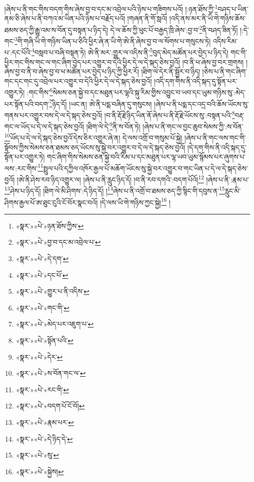 །ཞེས་པ་ནི་གང་གིས་བདག་གིས་ཞེས་བྱ་བ་དང་མ་འབྲེལ་པའི་ཉེས་པ་གཟིགས་པའོ། །:ཉན་ཐོས་ཀྱི་\footnote{«སྣར་»«པེ་»ཉན་ཐོས་ཀྱིས་}བཤད་པ་ཡིན་ནམ་ཅི་ཞེས་པ་ནི་བཀའ་མ་ཡིན་པའི་ཉེས་པ་བརྗོད་པའོ། །གཞན་ནི་གོ་སླའོ། །འདི་ནས་མར་ནི་ཡི་གེ་གཉིས་ཆོས་ཐམས་ཅད་ཀྱི་རྒྱུ་འམ་ས་བོན་དུ་བསྟན་པ་ཉིད་དེ། དེ་ལ་ཆོས་ཀྱི་ཕུང་པོ་བརྒྱད་ཁྲི་ཞེས་:བྱ་བ་\footnote{«སྣར་»«པེ་»བྱ་བ་དང་མ་འབྲེལ་པ་}ནི་བཤད་ཟིན་ཏོ། །:དེ་གང་\footnote{«སྣར་»«པེ་»དེ་དག་}གི་གཞི་ཡི་གེ་གཉིས་ཡིན་པ་ཅིའི་ཕྱིར་ཞེ་ན་ཡི་གེ་ཨེ་ནི་ཞེས་བྱ་བ་ལ་སོགས་པ་གསུངས་ཏེ། འདིས་རིམ་པ་:དང་པོའི་\footnote{«སྣར་»«པེ་»དང་པོ་}བསླབ་པ་བཞི་བསྟན་ཏེ། ཨེ་ནི་མར་:གྱུར་ལ་འདིས་ནི་\footnote{«སྣར་»«པེ་»གྱུར་པ་ནི་འདིས་}བུད་མེད་མཚོན་པར་བྱེད་པ་ཉིད་དེ། གང་གི་ཕྱིར་གང་གིས་གང་ལ་གང་ཞིག་བྱེད་པར་འགྱུར་བ་དེའི་ཕྱིར་དེ་ལ་དེ་སྐད་ཅེས་བྱའོ། །བ་ནི་ཕ་ཞེས་བྱ་བར་གྲགས། །ཞེས་བྱ་བ་ནི་བ་ཞེས་བྱ་བ་ཕ་མཚོན་པར་བྱེད་པ་ཉིད་ཀྱི་ཕྱིར་རོ། །ཐིག་ལེ་དེར་ནི་སྦྱོར་བ་ཉིད། །ཅེས་པ་ནི་གང་ཞིག་གང་དང་གང་དུ་འབྲེལ་པར་འགྱུར་བ་དེའི་ཕྱིར་དེ་ལ་དེ་སྐད་ཅེས་བྱའོ། །འདི་དག་གིས་ནི་འདི་སྐད་དུ་སྟོན་པར་འགྱུར་ཏེ། :གང་གིས་\footnote{«སྣར་»«པེ་»གང་གི་}སེམས་ཅན་སྐྱེ་བ་དང་མཐུན་པར་ལྷའི་སྐུ་རིམ་གྱིས་འབྱུང་བ་ཡབ་དང་ཡུམ་གཉིས་སུ་:མེད་པར་སྟོན་པའི་བདག་\footnote{«སྣར་»«པེ་»མེད་པར་འཇུག་པ་}ཉིད་དོ། །ཡང་ན། ཨེ་ནི་པདྨ་བཞིན་དུ་གསུངས། །ཞེས་པ་ནི་པདྨ་དང་འདྲ་བའི་ཆོས་ཡོངས་སུ་གནས་པར་འགྱུར་བས་དེ་ལ་དེ་སྐད་ཅེས་བྱའོ། །བ་ནི་རྡོ་རྗེ་ཉིད་ཡིན་ནོ་ཞེས་པ་ནི་རྡོ་རྗེ་ཡོངས་སུ་:བསྟན་པའི་\footnote{«སྣར་»«པེ་»སྟོན་པའི་}བརྡ་གང་ལ་ཡོད་པ་དེ་ལ་དེ་སྐད་ཅེས་བྱའོ། །ཐིག་ལེ་དེ་\footnote{«སྣར་»«པེ་»དེར་}ནི་ས་བོན་ཏེ། །ཞེས་པ་ནི་གང་ལ་བྱང་ཆུབ་སེམས་ཀྱི་:ས་བོན་\footnote{«སྣར་»«པེ་»ས་བོན་གང་ལ་}ཡོད་པ་དེ་ལ་དེ་སྐད་ཅེས་བྱའོ་དེས་ཅིར་འགྱུར་ཞེ་ན། དེ་ལས་འགྲོ་བ་གསུམ་པོ་སྐྱེ། །ཞེས་པ་ནི་གང་ལས་གང་གི་སྟོབས་ཀྱིས་སེམས་ཅན་ཐམས་ཅད་ཡོངས་སུ་སྐྱེ་བར་འགྱུར་བ་དེ་ལ་དེ་སྐད་ཅེས་བྱའོ། །དེ་དག་གིས་ནི་འདི་སྐད་དུ་སྟོན་པར་འགྱུར་ཏེ། གང་ཞིག་གིས་སེམས་ཅན་སྐྱེ་བའི་རིམ་པ་དང་མཐུན་པར་ལྷ་ཡབ་ཡུམ་སྙོམས་པར་ཞུགས་པ་ལས་:རང་གིས་\footnote{«སྣར་»«པེ་»རང་གི་}སྤྲུལ་པའི་དཀྱིལ་འཁོར་རྒྱལ་པོ་མཆོག་ཡོངས་སུ་སྐྱེ་བར་འགྱུར་བ་གང་ཡིན་པ་དེ་ལ་དེ་སྐད་ཅེས་བྱའོ། །ཨེ་ནི་ཤེས་རབ་ཉིད་འགྱུར་ལ། །ཞེས་པ་ནི་རླུང་ཉིད་དོ། །བ་ནི་རབ་དགའི་:བདག་པོའོ།\footnote{«སྣར་»«པེ་»བདག་པོ་ངོ་བོ།} །ཞེས་པ་ནི་:རྣམ་པ་\footnote{«སྣར་»«པེ་»རྣམ་པར་}ཤེས་པ་ཉིད་དོ། །ཐིག་ལེ་མི་ཤིགས་:དེ་ཉིད་དོ། །\footnote{«སྣར་»«པེ་»དེ་ཉིད་དེ་}ཞེས་པ་ནི་འགྲོ་བ་ཐམས་ཅད་ཀྱི་སྙིང་གི་དབུས་ན་\footnote{«སྣར་»«པེ་»སུ་}རླུང་མི་ཤིགས་རྒྱལ་པོ་ཨ་ཐུང་ངུའི་ངོ་བོར་སྣང་བའོ། །དེ་ལས་ཡི་གེ་གཉིས་ཀྱང་སྐྱེ།\footnote{«སྣར་»«པེ་»སྐྱེས།} །
